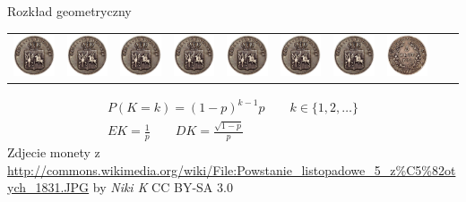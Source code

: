 \documentclass{mp}
\begin{document}
\begin{frame}{Rozkład geometryczny}
\tabcolsep=0cm
\begin{tabular}{cccccccccc}
\includegraphics[width=.1\textwidth]{head.jpg} &
\includegraphics[width=.1\textwidth]{head.jpg} &
\includegraphics[width=.1\textwidth]{head.jpg} &
\includegraphics[width=.1\textwidth]{head.jpg} &
\includegraphics[width=.1\textwidth]{head.jpg} &
\includegraphics[width=.1\textwidth]{head.jpg} &
\includegraphics[width=.1\textwidth]{head.jpg} &
\includegraphics[width=.1\textwidth]{tail.jpg} &
\end{tabular}
\begin{gather*}
P(K=k)=(1-p)^{k-1}p \qquad k\in\{1,2,\ldots\} \\
EK=\frac{1}{p} \qquad DK=\frac{\sqrt{1-p}}{p}
\end{gather*}
\vfill
{\tiny Zdjecie monety z \url{http://commons.wikimedia.org/wiki/File:Powstanie_listopadowe_5_z\%C5\%82otych_1831.JPG} by \emph{Niki K} CC BY-SA 3.0}
\end{frame}
\end{document}
